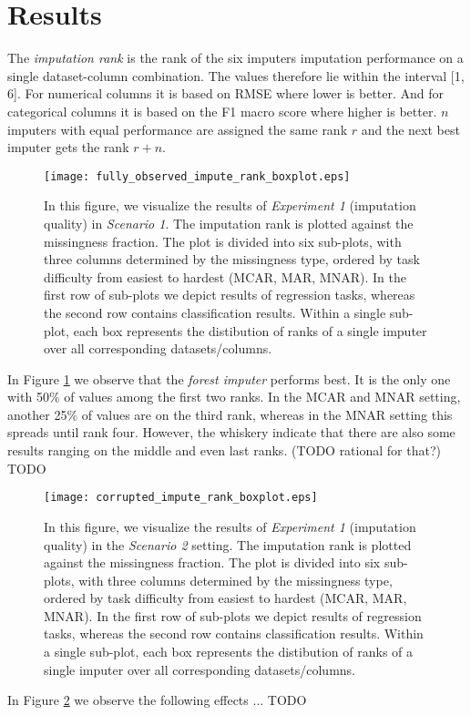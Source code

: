 \section{Results}
\label{sec:results}


The \textit{imputation rank} is the rank of the six imputers imputation performance on a single dataset-column combination. The values therefore lie within the interval [1, 6]. For numerical columns it is based on RMSE where lower is better. And for categorical columns it is based on the F1 macro score where higher is better. $n$ imputers with equal performance are assigned the same rank $r$ and the next best imputer gets the rank $r+n$.


\begin{figure}\centering
    \texttt{[image: fully\_observed\_impute\_rank\_boxplot.eps]}
    \caption[Scenario 1 Imputation Ranks]{In this figure, we visualize the results of \textit{Experiment 1} (imputation quality) in \textit{Scenario 1}. The imputation rank is plotted against the missingness fraction. The plot is divided into six sub-plots, with three columns determined by the missingness type, ordered by task difficulty from easiest to hardest (MCAR, MAR, MNAR). In the first row of sub-plots we depict results of regression tasks, whereas the second row contains classification results. Within a single sub-plot, each box represents the distibution of ranks of a single imputer over all corresponding datasets/columns.}\label{fig:fully_observed_impute_rank_boxplot}
\end{figure}

In Figure \ref{fig:fully_observed_impute_rank_boxplot} we observe that the \textit{forest imputer} performs best. It is the only one with 50\% of values among the first two ranks. In the MCAR and MNAR setting, another 25\% of values are on the third rank, whereas in the MNAR setting this spreads until rank four. However, the whiskery indicate that there are also some results ranging on the middle and even last ranks. (TODO rational for that?)
TODO

\begin{figure}\centering
    \texttt{[image: corrupted\_impute\_rank\_boxplot.eps]}

    \caption[Scenario 2 Imputation Ranks]{In this figure, we visualize the results of \textit{Experiment 1} (imputation quality) in the \textit{Scenario 2} setting. The imputation rank is plotted against the missingness fraction. The plot is divided into six sub-plots, with three columns determined by the missingness type, ordered by task difficulty from easiest to hardest (MCAR, MAR, MNAR). In the first row of sub-plots we depict results of regression tasks, whereas the second row contains classification results. Within a single sub-plot, each box represents the distibution of ranks of a single imputer over all corresponding datasets/columns.
    }\label{fig:corrupted_impute_rank_boxplot}
\end{figure}

In Figure \ref{fig:corrupted_impute_rank_boxplot} we observe the following effects ...
TODO
